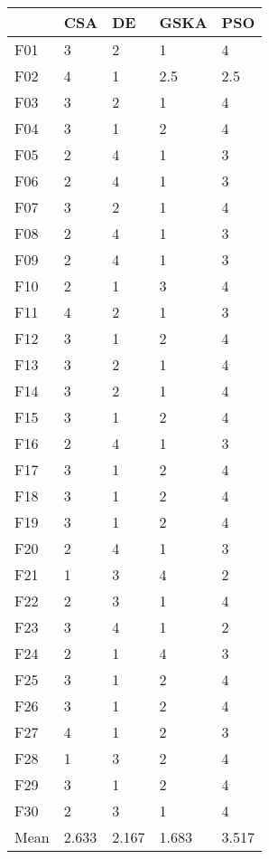 \begin{tabular}{lllll}
\toprule
{} &    CSA &     DE &   GSKA &    PSO \\
\midrule
F01  &      3 &      2 &      1 &      4 \\
F02  &      4 &      1 &    2.5 &    2.5 \\
F03  &      3 &      2 &      1 &      4 \\
F04  &      3 &      1 &      2 &      4 \\
F05  &      2 &      4 &      1 &      3 \\
F06  &      2 &      4 &      1 &      3 \\
F07  &      3 &      2 &      1 &      4 \\
F08  &      2 &      4 &      1 &      3 \\
F09  &      2 &      4 &      1 &      3 \\
F10  &      2 &      1 &      3 &      4 \\
F11  &      4 &      2 &      1 &      3 \\
F12  &      3 &      1 &      2 &      4 \\
F13  &      3 &      2 &      1 &      4 \\
F14  &      3 &      2 &      1 &      4 \\
F15  &      3 &      1 &      2 &      4 \\
F16  &      2 &      4 &      1 &      3 \\
F17  &      3 &      1 &      2 &      4 \\
F18  &      3 &      1 &      2 &      4 \\
F19  &      3 &      1 &      2 &      4 \\
F20  &      2 &      4 &      1 &      3 \\
F21  &      1 &      3 &      4 &      2 \\
F22  &      2 &      3 &      1 &      4 \\
F23  &      3 &      4 &      1 &      2 \\
F24  &      2 &      1 &      4 &      3 \\
F25  &      3 &      1 &      2 &      4 \\
F26  &      3 &      1 &      2 &      4 \\
F27  &      4 &      1 &      2 &      3 \\
F28  &      1 &      3 &      2 &      4 \\
F29  &      3 &      1 &      2 &      4 \\
F30  &      2 &      3 &      1 &      4 \\
Mean &  2.633 &  2.167 &  1.683 &  3.517 \\
\bottomrule
\end{tabular}
